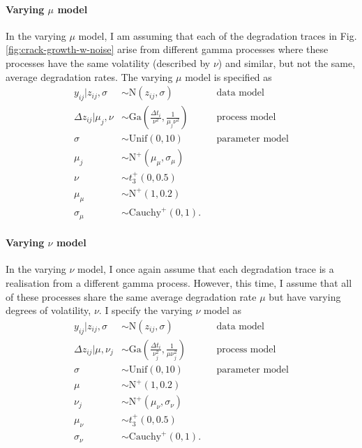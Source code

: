 \paragraph{Varying $\mu$ model} In the varying $\mu$ model, I am assuming that each of the degradation traces in Fig.\ref{fig:crack-growth-w-noise} arise from different gamma processes where these processes have the same volatility (described by $\nu$) and similar, but not the same, average degradation rates. The varying $\mu$ model is specified as
\begin{align*} 
   y_{ij}|z_{ij}, \sigma & \sim \mbox{N}(z_{ij}, \sigma)  && \mbox{data model} \\
   \Delta z_{ij}|\mu_j, \nu & \sim \mbox{Ga} \left( \frac{\Delta t_{i}}{\nu^2}, \frac{1}{\mu_j \nu^2} \right) && \mbox{process model} \\
   \sigma & \sim \mbox{Unif}(0, 10) && \mbox{parameter model} \\
   \mu_j & \sim \mbox{N}^{+}(\mu_{\mu}, \sigma_{\mu}) \\
   \nu & \sim t^{+}_3(0, 0.5) \\
   \mu_{\mu} & \sim \mbox{N}^{+}(1, 0.2) \\
   \sigma_{\mu} & \sim \mbox{Cauchy}^{+}(0, 1).
\end{align*}

\paragraph{Varying $\nu$ model} In the varying $\nu$ model, I once again assume that each degradation trace is a realisation from a different gamma process. However, this time, I assume that all of these processes share the same average degradation rate $\mu$ but have varying degrees of volatility, $\nu$. I specify the varying $\nu$ model as
\begin{align*} 
   y_{ij}|z_{ij}, \sigma & \sim \mbox{N}(z_{ij}, \sigma)  && \mbox{data model} \\
   \Delta z_{ij}|\mu, \nu_j & \sim \mbox{Ga} \left( \frac{\Delta t_{i}}{\nu_j^2}, \frac{1}{\mu \nu_j^2} \right) && \mbox{process model} \\
   \sigma & \sim \mbox{Unif}(0, 10) && \mbox{parameter model} \\
   \mu & \sim \mbox{N}^{+}(1, 0.2) \\
   \nu_j & \sim \mbox{N}^{+}(\mu_{\nu}, \sigma_{\nu}) \\
   \mu_{\nu} & \sim t^{+}_3(0, 0.5) \\
   \sigma_{\nu} & \sim \mbox{Cauchy}^{+}(0, 1).
\end{align*}

